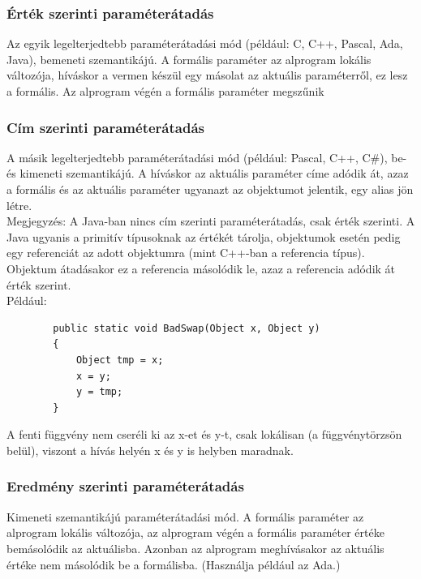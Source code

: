 \documentclass[margin=0px]{article}
\begin{document}
	\subsubsection{Érték szerinti paraméterátadás}
	
	Az egyik legelterjedtebb paraméterátadási mód (például: C, C++, Pascal, Ada, Java), bemeneti szemantikájú. A formális paraméter az alprogram lokális változója, híváskor a vermen készül egy másolat az aktuális paraméterről, ez lesz a formális. Az alprogram végén a formális paraméter megszűnik
	
	\subsubsection{Cím szerinti paraméterátadás}
	
	A másik legelterjedtebb paraméterátadási mód (például: Pascal, C++, C\#), be- és kimeneti szemantikájú. A híváskor az aktuális paraméter címe adódik át, azaz a formális és az aktuális paraméter ugyanazt az objektumot jelentik, egy alias jön létre.\\
	
	Megjegyzés: A Java-ban nincs cím szerinti paraméterátadás, csak érték szerinti. A Java ugyanis a primitív típusoknak az értékét tárolja,
	objektumok esetén pedig egy referenciát az adott objektumra (mint C++-ban a referencia típus).  Objektum átadásakor ez a referencia másolódik le, azaz a referencia adódik át érték szerint.\\
	
	\noindent	Például:
	\begin{verbatim}
	    public static void BadSwap(Object x, Object y)
	    {
	        Object tmp = x;
	        x = y;
	        y = tmp;
	    }
	\end{verbatim}
	
	A fenti függvény nem cseréli ki az x-et és y-t, csak lokálisan (a függvénytörzsön belül), viszont a hívás helyén
	x és y is helyben maradnak.
	
	\subsubsection{Eredmény szerinti paraméterátadás}
	
	Kimeneti szemantikájú paraméterátadási mód. A formális paraméter az alprogram lokális változója, az alprogram végén a formális paraméter értéke bemásolódik az aktuálisba. Azonban az alprogram meghívásakor az aktuális értéke nem másolódik be a formálisba. (Használja például az Ada.)
	
\end{document}
